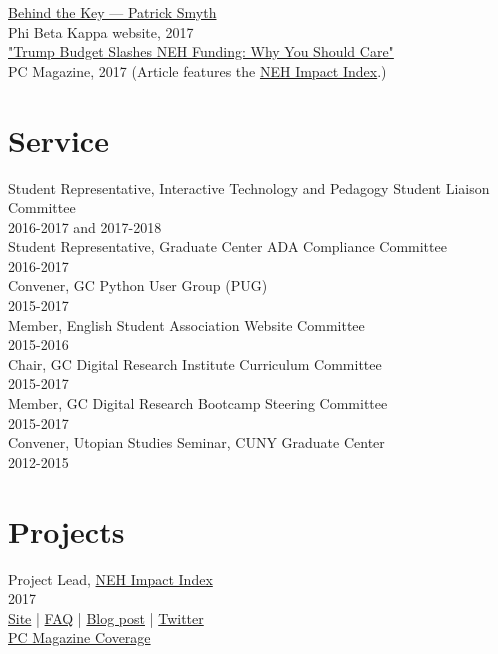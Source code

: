 \documentclass[11pt]{article}
\begin{document}
\href{https://www.pbk.org/patrick-smyth}{Behind the Key — Patrick Smyth}\\[0pt]
Phi Beta Kappa website, 2017\\[0pt]

\href{http://www.pcmag.com/commentary/353904/trump-budget-slashes-neh-funding-why-you-should-care}{"Trump Budget Slashes NEH Funding: Why You Should Care"}\\[0pt]
PC Magazine, 2017 (Article features the \href{http://www.nehimpact.org/}{NEH Impact Index}.)\\[0pt]

\section*{Service}
\label{sec:org7984480}
Student Representative, Interactive Technology and Pedagogy Student Liaison Committee\\[0pt]
2016-2017 and 2017-2018\\[0pt]

Student Representative, Graduate Center ADA Compliance Committee\\[0pt]
2016-2017\\[0pt]

Convener, GC Python User Group (PUG)\\[0pt]
2015-2017\\[0pt]

Member, English Student Association Website Committee\\[0pt]
2015-2016\\[0pt]

Chair, GC Digital Research Institute Curriculum Committee\\[0pt]
2015-2017\\[0pt]

Member, GC Digital Research Bootcamp Steering Committee\\[0pt]
2015-2017\\[0pt]

Convener, Utopian Studies Seminar, CUNY Graduate Center\\[0pt]
2012-2015\\[0pt]
\section*{Projects}
\label{sec:org1f75306}
Project Lead, \href{http://www.nehimpact.org/}{NEH Impact Index}\\[0pt]
2017\\[0pt]
\href{http://www.nehimpact.org/}{Site} | \href{http://www.nehimpact.org/faq}{FAQ} | \href{https://digitalfellows.commons.gc.cuny.edu/2017/04/10/exploring-the-local-impact-of-the-neh-neh-impact-index/}{Blog post} | \href{https://x.com/psmyth01/status/851505002900336644}{Twitter}\\[0pt]
\href{http://www.pcmag.com/commentary/353904/trump-budget-slashes-neh-funding-why-you-should-care}{PC Magazine Coverage}\\[0pt]
\end{document}

